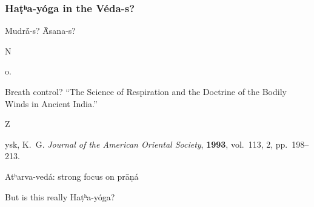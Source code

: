 \documentclass[pdf]{beamer}
\newcommand{\Subitem}[1]{{\setlength\itemindent{12pt} \item[-] #1}}
\begin{document}
\begin{frame} \frametitle{Haṭʰa-yóga in the Véda-s?}
\begin{itemize}
	\item Mudrā́-s? Ā́sana-s?
	\Subitem No.
	\item Breath control? ``The Science of Respiration and the Doctrine of the Bodily Winds in Ancient India.''
	\Subitem Zysk, K.~G. \emph{Journal of the American Oriental Society}, \textbf{1993}, vol.~113, 2, pp.~198--213.
	\item Atʰarva-vedá: strong focus on prāṇá
	\item But is this really Haṭʰa-yóga?
\end{itemize}
\end{frame}

\end{document}
